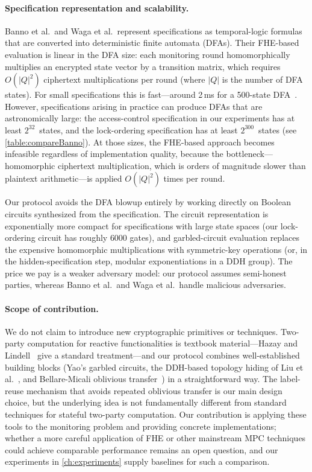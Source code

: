 \paragraph{Specification representation and scalability.}
Banno et al.\ and Waga et al.\ represent specifications as temporal-logic formulas that are converted into deterministic finite automata (DFAs). Their FHE-based evaluation is linear in the DFA size: each monitoring round homomorphically multiplies an encrypted state vector by a transition matrix, which requires $O(|Q|^2)$ ciphertext multiplications per round (where $|Q|$ is the number of DFA states). For small specifications this is fast---around 2\,ms for a 500-state DFA~\cite{BMMBWS22}. However, specifications arising in practice can produce DFAs that are astronomically large: the access-control specification in our experiments has at least $2^{32}$~states, and the lock-ordering specification has at least $2^{300}$~states (see \cref{table:compareBanno}). At those sizes, the FHE-based approach becomes infeasible regardless of implementation quality, because the bottleneck---homomorphic ciphertext multiplication, which is orders of magnitude slower than plaintext arithmetic---is applied $O(|Q|^2)$ times per round.

Our protocol avoids the DFA blowup entirely by working directly on Boolean circuits synthesized from the specification. The circuit representation is exponentially more compact for specifications with large state spaces (our lock-ordering circuit has roughly $6000$ gates), and garbled-circuit evaluation replaces the expensive homomorphic multiplications with symmetric-key operations (or, in the hidden-specification step, modular exponentiations in a DDH group). The price we pay is a weaker adversary model: our protocol assumes semi-honest parties, whereas Banno et al.\ and Waga et al.\ handle malicious adversaries.

\paragraph{Scope of contribution.}
We do not claim to introduce new cryptographic primitives or techniques. Two-party computation for reactive functionalities is textbook material---Hazay and Lindell~\cite{HL10} give a standard treatment---and our protocol combines well-established building blocks (Yao's garbled circuits, the DDH-based topology hiding of Liu et al.~\cite{LWY22}, and Bellare-Micali oblivious transfer~\cite{BM89}) in a straightforward way. The label-reuse mechanism that avoids repeated oblivious transfer is our main design choice, but the underlying idea is not fundamentally different from standard techniques for stateful two-party computation. Our contribution is applying these tools to the monitoring problem and providing concrete implementations; whether a more careful application of FHE or other mainstream MPC techniques could achieve comparable performance remains an open question, and our experiments in \cref{ch:experiments} supply baselines for such a comparison.


